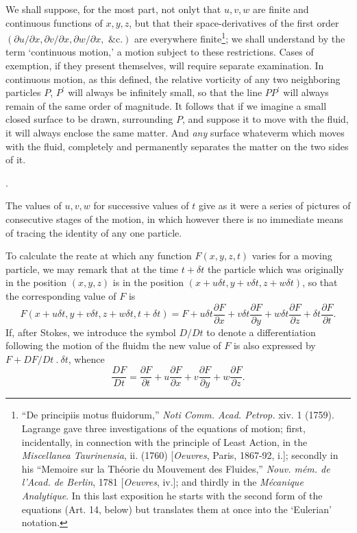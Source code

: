 \documentclass[twoside, openany]{book}
\newcommand{\edot}{\>.\>}
\newcommand{\pdiff}[2]{\frac{\partial #1}{\partial #2}}
\newcounter{article}
\newcommand{\article}[1]{
  \stepcounter{article}
  \textbf{\thearticle}.
  \markright{#1} %
}
\numberwithin{equation}{article} %
\begin{document}
We shall suppose, for the most part, not onlyt that $u, v, w$ are finite and continuous functions of $x, y, z$, but that their space-derivatives of the first order $(\partial u/\partial x, \partial v/\partial x, \partial w/\partial x, \textrm{ \&c.})$ are everywhere finite\footnote{``De principiis motus fluidorum,'' \textit{Noti Comm. Acad. Petrop.} xiv. 1 (1759).\\Lagrange gave three investigations of the equations of motion; first, incidentally, in connection with the principle of Least Action, in the \textit{Miscellanea Taurinensia}, ii. (1760) [\textit{Oeuvres}, Paris, 1867-92, i.]; secondly in his ``Memoire sur la Th\'eorie du Mouvement des Fluides,'' \textit{Nouv. m\'em. de l'Acad. de Berlin}, 1781 [\textit{Oeuvres}, iv.]; and thirdly in the \textit{M\'ecanique Analytique}. In this last exposition he starts with the second form of the equations (Art. 14, below) but translates them at once into the `Eulerian' notation.}; we shall understand by the term `continuous motion,' a motion subject to these restrictions. Cases of exemption, if they present themselves, will require separate examination. In continuous motion, as this defined, the relative vorticity of any two neighboring particles $P$, $P^\prime$ will always be infinitely small, so that the line $PP^\prime$ will always remain of the same order of magnitude. It follows that if we imagine a small closed surface to be drawn, surrounding $P$, and suppose it to move with the fluid, it will always enclose the same matter. And \emph{any} surface whateverm which moves with the fluid, completely and permanently separates the matter on the two sides of it.

\article{a5}
The values of $u, v, w$ for successive values of $t$ give as it were a series of pictures of consecutive stages of the motion, in which however there is no immediate means of tracing the identity of any one particle.

To calculate the reate at which any function $F(x, y, z, t)$ varies for a moving particle, we may remark that at the time $t+\delta t$ the particle which was originally in the position $(x, y, z)$ is in the position $(x+u\delta t, y+v\delta t, z+w\delta t)$, so that the corresponding value of $F$ is
\begin{equation*}
F(x+u\delta t, y+v\delta t, z+w\delta t, t+\delta t) = F + u \delta t \pdiff{F}{x} + v \delta t \pdiff{F}{y} + w \delta t \pdiff{F}{z} + \delta t \pdiff{F}{t}.
\end{equation*}
If, after Stokes, we introduce the symbol $D/Dt$ to denote a differentiation following the motion of the fluidm the new value of $F$ is also expressed by $F + DF/Dt \edot \delta t$, whence
\begin{equation} \label{material_diff}
\frac{DF}{Dt} = \pdiff{F}{t} + u\pdiff{F}{x} + v\pdiff{F}{y} + w\pdiff{F}{z}.
\end{equation}
\end{document}

